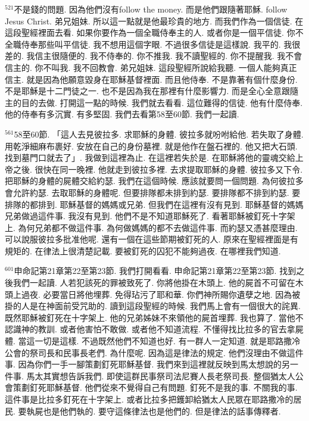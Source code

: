 \documentclass{book}
\begin{document}
$^{521}$不是錢的問題.
因為他們沒有follow the money.
而是他們跟隨著耶穌.
follow Jesus Christ.
弟兄姐妹.
所以這一點就是他最珍貴的地方.
而我們作為一個信徒.
在這段聖經裡面去看.
如果你要作為一個全職侍奉主的人.
或者你是一個平信徒.
你不全職侍奉那些叫平信徒.
我不想用這個字眼.
不過很多信徒是這樣說.
我平的.
我很差的.
我信主很隨便的.
我不侍奉的.
你不推我.
我不讀聖經的.
你不提醒我.
我不會信主的.
你不叫我.
我不回教會.
弟兄姐妹.
這段聖經所說給我聽.
一個人能夠真正信主.
就是因為他願意毀身在耶穌基督裡面.
而且他侍奉.
不是靠著有個什麼身份.
不是耶穌是十二門徒之一.
也不是因為我在那裡有什麼影響力.
而是全心全意跟隨主的目的去做.
打開這一點的時候.
我們就去看看.
這位難得的信徒.
他有什麼侍奉.
他的侍奉有多沉實.
有多堅固.
我們去看第58至60節.
我們一起讀.

$^{561}$58至60節.
「這人去見彼拉多.
求耶穌的身體.
彼拉多就吩咐給他.
若失取了身體.
用乾淨細麻布裹好.
安放在自己的身份墓裡.
就是他作在盤石裡的.
他又把大石頭.
找到墓門口就去了」.
我做到這裡為止.
在這裡若失於是.
在耶穌將他的靈魂交給上帝之後.
很快在同一晚裡.
他就走到彼拉多裡.
去求提取耶穌的身體.
彼拉多又下令.
把耶穌的身體的屍體交給約瑟.
我們在這個時候.
應該就要問一個問題.
為何彼拉多會允許約瑟.
去取耶穌的身體呢.
但要排隊都未排到約瑟.
要排隊都不排到約瑟.
要排隊的都排到.
耶穌基督的媽媽或兄弟.
但我們在這裡有沒有見到.
耶穌基督的媽媽兄弟做過這件事.
我沒有見到.
他們不是不知道耶穌死了.
看著耶穌被釘死十字架上.
為何兄弟都不做這件事.
為何做媽媽的都不去做這件事.
而約瑟又憑甚麼理由.
可以說服彼拉多批准他呢.
還有一個在這些節期被釘死的人.
原來在聖經裡面是有規矩的.
在律法上很清楚記載.
要被釘死的囚犯不能夠過夜.
在哪裡我們知道.

$^{601}$申命記第21章第22至第23節.
我們打開看看.
申命記第21章第22至第23節.
找到之後我們一起讀.
人若犯該死的罪被致死了.
你將他掛在木頭上.
他的屍首不可留在木頭上過夜.
必要當日將他埋葬.
免得玷污了耶和華.
你們神所賜你遺孽之地.
因為被掛的人是在神面前受咒助的.
讀到這段聖經的時候.
我們馬上會有一個很大的詫異.
既然耶穌被釘死在十字架上.
他的兄弟姊妹不來領他的屍首埋葬.
我也算了.
當他不認識神的教訓.
或者他害怕不敢做.
或者他不知道流程.
不懂得找比拉多的官去拿屍體.
當這一切是這樣.
不過既然他們不知道也好.
有一群人一定知道.
就是耶路撒冷公會的祭司長和民事長老們.
為什麼呢.
因為這是律法的規定.
他們沒理由不做這件事.
因為你們一手一腳策劃釘死耶穌基督.
我們來到這裡就反映到馬太想說的另一件事.
馬太其實想告訴我們.
即使這群民事祭司法尼賽人長老祭司長.
整個猶太人公會策劃釘死耶穌基督.
他們從來不覺得自己有問題.
釘死不是我的事.
不關我的事.
這件事是比拉多釘死在十字架上.
或者比拉多把鑊卸給猶太人民眾在耶路撒冷的居民.
要執屍也是他們執的.
要守這條律法也是他們的.
但是律法的話事傳釋者.
\end{document}
